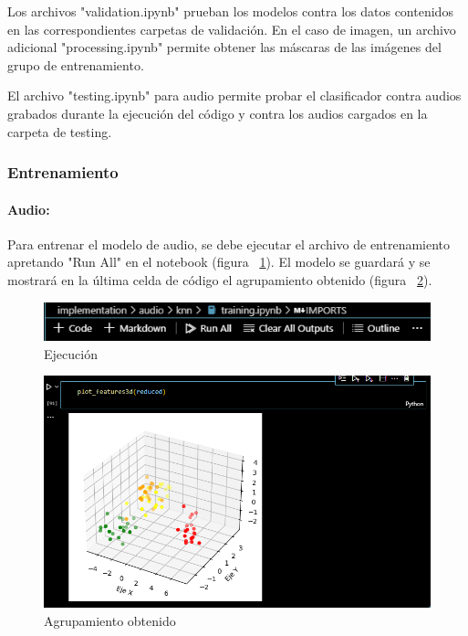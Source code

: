 \documentclass[a4paper, 12pt]{article}
\begin{document}
Los archivos "validation.ipynb" prueban los modelos contra los datos contenidos en las correspondientes carpetas de validación. En el caso de imagen, un archivo adicional "processing.ipynb" permite obtener las máscaras de las imágenes del grupo de entrenamiento.

El archivo "testing.ipynb" para audio permite probar el clasificador contra audios grabados durante la ejecución del código y contra los audios cargados en la carpeta de testing.

\subsubsection{Entrenamiento}

\paragraph{Audio:} Para entrenar el modelo de audio, se debe ejecutar el archivo de entrenamiento apretando "Run All" en el notebook (figura ~\ref{ENTRENAMIENTO AUDIO}). El modelo se guardará y se mostrará en la última celda de código el agrupamiento obtenido (figura ~\ref{ENTRENAMIENTO AUDIO 1}).
\begin{figure}[!htbp]
    \centering
    \includegraphics[width=\linewidth]{ENTRENAMIENTO_AUDIO.PNG}
    \caption{Ejecución}
    \label{ENTRENAMIENTO AUDIO}
\end{figure}
\begin{figure}[!htbp]
    \centering
    \includegraphics[width=\linewidth]{ENTRENAMIENTO_AUDIO1.PNG}
    \caption{Agrupamiento obtenido}
    \label{ENTRENAMIENTO AUDIO 1}
\end{figure}
\end{document}
